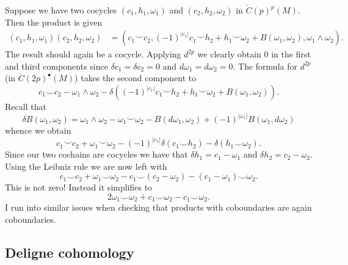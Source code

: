 \documentclass{amsart}
\begin{document}
Suppose we have two cocycles $(c_1,h_1,\omega_1)$ and $(c_2,h_2,\omega_2)$ in
$\check C(p)^p(M)$. Then the product is given
\begin{align*}
    (c_1,h_1,\omega_1)(c_2,h_2,\omega_2) &= (c_1\smile c_2, (-1)^{|c_1|}c_1\smile h_2+h_1\smile\omega_2+B(\omega_1,\omega_2), \omega_1\wedge\omega_2).
\end{align*}
The result should again be a cocycle. Applying $d^{2p}$ we clearly obtain 0 in the first
and third components since $\delta c_1=\delta c _2=0$ and $d\omega_1=d\omega_2=0$.
The formula for $d^{2p}$ (in $\check C(2p)^\bullet(M)$) takes the second component to
\begin{equation*}
    c_1\smile c_2 - \omega_1\wedge\omega_2 - \delta \left( (-1)^{|c_1|}c_1\smile h_2+h_1\smile \omega_2 + B(\omega_1,\omega_2) \right).
\end{equation*}
Recall that
\begin{equation*}
    \delta B(\omega_1,\omega_2) = \omega_1\wedge\omega_2-\omega_1\smile\omega_2-B(d\omega_1,\omega_2)+(-1)^{|\omega_1|}B(\omega_1,d\omega_2)
\end{equation*}
whence we obtain
\begin{equation*}
    c_1\smile c_2 +\omega_1\smile\omega_2-(-1)^{|c_1|}\delta(c_1\smile h_2) - \delta(h_1\smile\omega_2).
\end{equation*}
Since our two cochains are cocycles we have that $\delta h_1=c_1-\omega_1$ and $\delta h_2=c_2-\omega_2$.
Using the Leibniz rule we are now left with
\begin{equation*}
    c_1\smile c_2 + \omega_1\smile\omega_2 - c_1\smile (c_2 -\omega_2) - (c_1 - \omega_1)\smile \omega_2.
\end{equation*}
This is not zero! Instead it simplifies to
\begin{equation*}
    2\omega_1\smile\omega_2 +c_1\smile\omega_2-c_1\smile\omega_2.
\end{equation*}
I run into similar issues when checking that products with coboundaries are again
coboundaries.

\subsection{Deligne cohomology}
\end{document}
